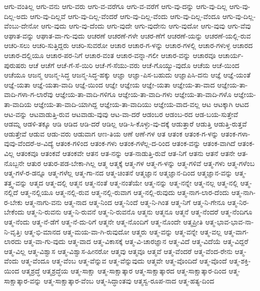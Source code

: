 {ಆಗು-ವಂತಿಲ್ಲ
ಆಗು-ವನು
ಆಗು-ವರು
ಆಗು-ವ-ವರೆಗೂ
ಆಗು-ವ-ವರೆಗೆ
ಆಗು-ವು-ದನ್ನು
ಆಗು-ವು-ದಿಲ್ಲ
ಆಗು-ವು-ದಿಲ್ಲ-ಅದು
ಆಗು-ವು-ದಿಲ್ಲವೆ
ಆಗು-ವು-ದಿಲ್ಲ-ವೆಂದರೆ
ಆಗು-ವು-ದಿಲ್ಲ-ವೆಂದು
ಆಗು-ವು-ದಿಲ್ಲ-ವೆಂದೂ
ಆಗು-ವು-ದಿಲ್ಲ-ವೆಂಬು-ದೇನೋ
ಆಗು-ವುದು
ಆಗು-ವು-ದೆಂದು
ಆಗು-ವುದೇ
ಆಗು-ವುದೇನು
ಆಗು-ವುದೋ
ಆಗು-ವುವು
ಆಗು-ವೆವು
ಆಘಾತ-ವನ್ನು
ಆಘಾತ-ವಾ-ಗು-ವುದು
ಆಚರಣೆ
ಆಚರಣೆ-ಗಳೇ
ಆಚರ-ಣೆಗೆ
ಆಚರಣೆ-ಯನ್ನು
ಆಚರಣೆ-ಯಲ್ಲಿ-ರುವ
ಆಚರಿ-ಸಲು
ಆಚರಿ-ಸುತ್ತಿದ್ದರು
ಆಚರಿ-ಸುವರೋ
ಆಚಾರ
ಆಚಾರ-ಗ-ಳನ್ನು
ಆಚಾರ-ಗಳಲ್ಲಿ
ಆಚಾರ-ಗಳುಳ್ಳ
ಆಚಾರದ
ಆಚಾರ-ದಲ್ಲಿಯೂ
ಆಚಾರ-ಪರ-ನಿಗೆ
ಆಚಾರ-ವಂತ
ಆಚಾರ-ವನ್ನಾ-ಗಲೀ
ಆಚಾರ-ವನ್ನು
ಆಚಾರವೂ
ಆಚಾರ್ಯ-ಪುರುಷರು
ಆಚೆ
ಆಚೆಗೆ
ಆಚೆ-ಗೆ-ಸೆ-ಯಿರಿ
ಆಚೆ-ಗೆ-ಸೆಯು-ವರು
ಆಚೆ-ಗೊಯ್ಯು-ವುದೊ
ಆಚೆಯ
ಆಚೆ-ಯಿಂದ
ಆಚೆಯೂ
ಆಜನ್ಮ
ಆಜನ್ಮ-ಸಿದ್ಧ
ಆಜನ್ಮ-ಸಿದ್ಧ-ಹಕ್ಕು
ಆಜ್ಞಾ
ಆಜ್ಞಾ-ಪಿಸ-ಬಹುದು
ಆಜ್ಞಾಪಿಸಿ-ದನು
ಆಜ್ಞೆ
ಆಜ್ಞೆ-ಯಂತೆ
ಆಜ್ಞೆ-ಯತಾ
ಆಜ್ಞೆ-ಯತಾ-ವಾದಿ
ಆಜ್ಞೆ-ಯಿಂದ
ಆಜ್ಞೇ
ಆಜ್ಞೇಯ
ಆಜ್ಞೇ-ಯತಾ
ಆಜ್ಞೇಯ-ತಾ-ವಾದ
ಆಜ್ಞೇಯ-ತಾ-ವಾದಿ-ಗಳಾ-ಗ-ಲಾರೆವು
ಆಜ್ಞೇಯ-ತಾ-ವಾದಿ-ಗಳಿಗೂ
ಆಜ್ಞೇಯ-ತಾ-ವಾದಿ-ಗಳು
ಆಜ್ಞೇಯ-ತಾ-ವಾದಿ-ಗಳೊ
ಆಜ್ಞೇಯ-ತಾ-ವಾದಿಯ
ಆಜ್ಞೇಯ-ತಾ-ವಾದಿ-ಯಾಗಿದ್ದ
ಆಜ್ಞೇಯ-ತಾ-ವಾದಿಯು
ಆಜ್ಞೇಯ-ವಾದ-ವಲ್ಲ
ಆಟ
ಆಟಕ್ಕಾಗಿ
ಆಟದ
ಆಟ-ವನ್ನು
ಆಟವಾಡುತ್ತಿ-ರುವ
ಆಟವಾಡು-ವುವು
ಆಟ-ವಾ-ದರೆ
ಆಡಂಬರ
ಆಡಂಬ-ರದ
ಆಡ-ಬಯ-ಸುತ್ತೇವೆ
ಆಡಮ್ನ
ಆಡಳಿ-ತಕ್ಕೂ
ಆಡಿ
ಆಡಿದ
ಆಡಿ-ದರೆ
ಆಡಿಲ್ಲ
ಆಡಿ-ಸಿ-ಕೊಳ್ಳು-ವು-ದಕ್ಕೆ
ಆಡುತ್ತಾರೆ
ಆಡುತ್ತಿ
ಆಡುತ್ತಿ-ರುತ್ತವೆ
ಆಡುತ್ತೇವೆ
ಆಡುವ
ಆಡು-ವರು
ಆಡುವಾಗ
ಆಣ-ತಿಯ
ಆಣೆ
ಆಣೆ-ಗಳ
ಆತ
ಆತಂಕ
ಆತಂಕ-ಗ-ಳನ್ನು
ಆತಂಕ-ಗಳಾ-ವುವು-ವೆಂದರೆ-ಅ-ವಿದ್ಯೆ
ಆತಂಕ-ಗಳಿಂದ
ಆತಂಕ-ಗಳು
ಆತಂಕ-ಗಳೆಲ್ಲ-ದ-ರಿಂದ
ಆತಂಕ-ವನ್ನು
ಆತಂಕ-ವಾಗಿದೆ
ಆತಂಕ-ವಿಲ್ಲ
ಆತಂಕವೂ
ಆತಂಕವೆ
ಆತಂಕವೇ
ಆತನ
ಆತ-ನನ್ನು
ಆತ-ನಾಡುತ್ತಿ-ರುವೆ
ಆತ-ನಿಗೆ
ಆತನು
ಆತನೆ
ಆತನೇ
ಆತ-ನೊಬ್ಬನೇ
ಆತುರ
ಆತುರ-ಪಡ-ಬೇಕಾ-ಗಿಲ್ಲ
ಆತ್ಮ
ಆತ್ಮಕ್ಕೆ
ಆತ್ಮ-ಗಳ
ಆತ್ಮ-ಗ-ಳನ್ನು
ಆತ್ಮ-ಗಳಿವೆ
ಆತ್ಮ-ಗಳು
ಆತ್ಮ-ಗಳೆಂಬ
ಆತ್ಮ-ಗಳೆ-ರ-ಡನ್ನೂ
ಆತ್ಮ-ಗಳೆಲ್ಲ
ಆತ್ಮ-ಗಾ-ನದ
ಆತ್ಮ-ಚಿಂತನೆ
ಆತ್ಮಜ್ಞಾನ
ಆತ್ಮಜ್ಞಾನ-ದಿಂದ
ಆತ್ಮಜ್ಞಾನ-ವನ್ನು
ಆತ್ಮ-ತತ್ತ್ವ-ವನ್ನು
ಆತ್ಮದ
ಆತ್ಮ-ದಲ್ಲಿ
ಆತ್ಮನ
ಆತ್ಮ-ನಂತೆ
ಆತ್ಮ-ನಂತೆಯೇ
ಆತ್ಮ-ನನ್ನು
ಆತ್ಮ-ನನ್ನೇ
ಆತ್ಮ-ನಲ್ಲ
ಆತ್ಮ-ನಲ್ಲಿ
ಆತ್ಮ-ನಲ್ಲಿದೆ
ಆತ್ಮ-ನಲ್ಲಿಯೂ
ಆತ್ಮ-ನಲ್ಲಿ-ರುವ
ಆತ್ಮ-ನಲ್ಲಿ-ರುವಾಗ
ಆತ್ಮ-ನಲ್ಲಿ-ರುವುದು
ಆತ್ಮ-ನಾಗ-ಲಾರ-ದೆಂದು
ಆತ್ಮ-ನಾಗಿ-ರ-ಬೇಕು
ಆತ್ಮ-ನಾಗು-ವನು
ಆತ್ಮ-ನಾದ
ಆತ್ಮ-ನಿಂದ
ಆತ್ಮ-ನಿಂದೆ
ಆತ್ಮ-ನಿ-ಗಿಂತ
ಆತ್ಮ-ನಿಗೆ
ಆತ್ಮ-ನಿ-ಗೇನೂ
ಆತ್ಮ-ನಿರ-ಬೇಕೆಂದು
ಆತ್ಮ-ನಿ-ರುವನು
ಆತ್ಮ-ನಿ-ರುವನೆ
ಆತ್ಮ-ನಿ-ರುವನೊ
ಆತ್ಮನು
ಆತ್ಮನೂ
ಆತ್ಮನೆ
ಆತ್ಮ-ನೆಂದರೆ
ಆತ್ಮ-ನೆಂದಿಗೂ
ಆತ್ಮ-ನೆಂದು
ಆತ್ಮ-ನೆ-ಡೆಗೆ
ಆತ್ಮ-ನೆ-ದು-ರಿಗೆ
ಆತ್ಮನೇ
ಆತ್ಮ-ನೊಂದಿಗೆ
ಆತ್ಮ-ನೊಂದೇ
ಆತ್ಮಪ್ರೀತಿ
ಆತ್ಮ-ಭಾವ-ಭಾವ-ನಾ-ನಿ-ವೃತ್ತಿಃ
ಆತ್ಮ-ಭಿ-ಮಾನದ
ಆತ್ಮ-ಮಯ-ವಾ-ಗಿ-ರುವುದೋ
ಆತ್ಮರು
ಆತ್ಮ-ವನ್ನು
ಆತ್ಮ-ವನ್ನೇ
ಆತ್ಮ-ವಲ್ಲ
ಆತ್ಮ-ವಾಗ-ಲಾರದು
ಆತ್ಮ-ವಾ-ಗು-ವುದು
ಆತ್ಮ-ವಾದ
ಆತ್ಮ-ವಿಕಾಸಕ್ಕೆ
ಆತ್ಮ-ವಿ-ಚಾರಜ್ಞಾನ
ಆತ್ಮ-ವಿದೆ
ಆತ್ಮ-ವಿದೆಯೆ
ಆತ್ಮ-ವಿದ್ದರೆ
ಆತ್ಮ-ವಿಲ್ಲ
ಆತ್ಮ-ವಿಶ್ವಾಸ
ಆತ್ಮ-ವಿಶ್ವಾಸ-ಹೀನರೋ
ಆತ್ಮವು
ಆತ್ಮವೂ
ಆತ್ಮವೆ
ಆತ್ಮ-ವೆಂದರೆ
ಆತ್ಮ-ವೆಂದ-ರೇನು
ಆತ್ಮ-ವೆಂದು
ಆತ್ಮ-ವೆಂದೂ
ಆತ್ಮ-ವೆಂಬ
ಆತ್ಮ-ವೆನ್ನುವ
ಆತ್ಮ-ವೆನ್ನುವುದು
ಆತ್ಮವೇ
ಆತ್ಮ-ವೊಂದಿದೆ
ಆತ್ಮ-ವೊಂದೆ
ಆತ್ಮ-ಶಕ್ತಿ-ಯಿಂದ
ಆತ್ಮಶ್ರದ್ಧೆ
ಆತ್ಮಶ್ರದ್ಧೆಯ
ಆತ್ಮ-ಸಾಕ್ಷಾ
ಆತ್ಮ-ಸಾಕ್ಷಾತ್ಕಾರ
ಆತ್ಮ-ಸಾಕ್ಷಾತ್ಕಾರದ
ಆತ್ಮ-ಸಾಕ್ಷಾತ್ಕಾರ-ದಿಂದ
ಆತ್ಮ-ಸಾಕ್ಷಾತ್ಕಾರ-ವನ್ನು
ಆತ್ಮ-ಸಾಕ್ಷಾತ್ಕಾರ-ವೆಂಬ
ಆತ್ಮ-ಸಿದ್ಧಾಂತವು
ಆತ್ಮಸ್ವ-ರೂಪ-ನಾದ
ಆತ್ಮ-ಹತ್ಯ-ದಿಂದ
}
